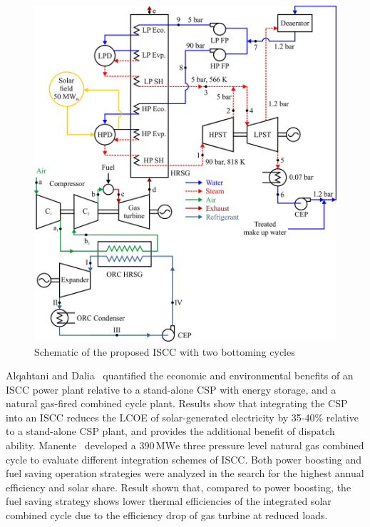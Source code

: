\begin{figure}[!ht]
\centering
\includegraphics[width=.8\textwidth]{fig/Shaaban2016.jpg}
\caption{Schematic of the proposed ISCC with two bottoming cycles}\label{fig:Shaaban2016}
\end{figure}
Alqahtani and Dalia~\cite{Alqahtani2016} quantified the economic and environmental benefits of an ISCC power plant relative to a stand-alone CSP with energy storage, and a natural gas-fired combined cycle plant. Results show that integrating the CSP into an ISCC reduces the LCOE of solar-generated electricity by 35-40\% relative to a stand-alone CSP plant, and provides the additional benefit of dispatch ability.
Manente~\cite{Manente2016} developed a 390$\,\mathrm{MWe}$ three pressure level natural gas combined cycle to evaluate different integration schemes of ISCC. Both power boosting and fuel saving operation strategies were analyzed in the search for the highest annual efficiency and solar share. Result shown that, compared to power boosting, the fuel saving strategy shows lower thermal efficiencies of the integrated solar combined cycle due to the efficiency drop of gas turbine at reduced loads.
